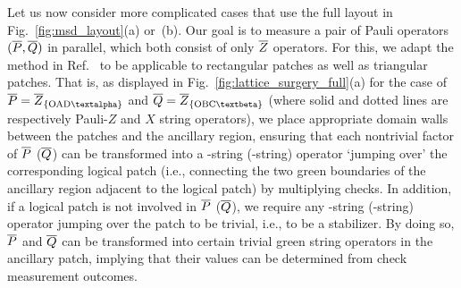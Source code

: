 \documentclass[
 prx,
 reprint,
 superscriptaddress,
 longbibliography,
 dvipsnames
]{revtex4-2}
\begin{document}
Let us now consider more complicated cases that use the full layout in Fig.~\ref{fig:msd_layout}(a) or~(b).
Our goal is to measure a pair of Pauli operators $(\overline{P}, \overline{Q})$ in parallel, which both consist of only $\overline{Z}$ operators.
For this, we adapt the method in Ref.~\cite{thomsen2024low} to be applicable to rectangular patches as well as triangular patches.
That is, as displayed in Fig.~\ref{fig:lattice_surgery_full}(a) for the case of $\lgc{P} = \lgztp{OAD\talpha}$ and $\lgc{Q} = \lgztp{OBC\tbeta}$ (where solid and dotted lines are respectively Pauli-$Z$ and $X$ string operators), we place appropriate domain walls between the patches and the ancillary region, ensuring that each nontrivial factor of $\overline{P}$ ($\overline{Q}$) can be transformed into a \gx-string (\gz-string) operator `jumping over' the corresponding logical patch (i.e., connecting the two green boundaries of the ancillary region adjacent to the logical patch) by multiplying checks.
In addition, if a logical patch is not involved in $\overline{P}$ ($\overline{Q}$), we require any \gx-string (\gz-string) operator jumping over the patch to be trivial, i.e., to be a stabilizer.
By doing so, $\overline{P}$ and $\overline{Q}$ can be transformed into certain trivial green string operators in the ancillary patch, implying that their values can be determined from check measurement outcomes.
\end{document}
